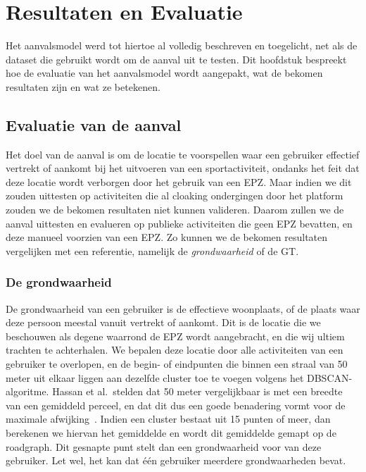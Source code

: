 \chapter{Resultaten en Evaluatie}
Het aanvalsmodel werd tot hiertoe al volledig beschreven en toegelicht, net als
de dataset die gebruikt wordt om de aanval uit te testen. Dit hoofdstuk
bespreekt hoe de evaluatie van het aanvalsmodel wordt aangepakt, wat de bekomen
resultaten zijn en wat ze betekenen.

\section{Evaluatie van de aanval}
Het doel van de aanval is om de locatie te voorspellen waar een gebruiker
effectief vertrekt of aankomt bij het uitvoeren van een sportactiviteit,
ondanks het feit dat deze locatie wordt verborgen door het gebruik van een
\ac{EPZ}. Maar indien we dit zouden uittesten op activiteiten die al cloaking
ondergingen door het platform zouden we de bekomen resultaten niet kunnen
valideren. Daarom zullen we de aanval uittesten en evalueren op publieke
activiteiten die geen \ac{EPZ} bevatten, en deze manueel voorzien van een
\ac{EPZ}. Zo kunnen we de bekomen resultaten vergelijken met een referentie,
namelijk de \textit{grondwaarheid} of de \ac{GT}.

\subsection{De grondwaarheid}\label{sec:groundtruth}
De grondwaarheid van een gebruiker is de effectieve woonplaats, of de plaats
waar deze persoon meestal vanuit vertrekt of aankomt. Dit is de locatie die we
beschouwen als degene waarrond de \ac{EPZ} wordt aangebracht, en die wij ultiem
trachten te achterhalen. We bepalen deze locatie door alle activiteiten van een
gebruiker te overlopen, en de begin- of eindpunten die binnen een straal van 50
meter uit elkaar liggen aan dezelfde cluster toe te voegen volgens het
\ac{DBSCAN}-algoritme. Hassan et al.\ stelden dat 50 meter vergelijkbaar is met
een breedte van een gemiddeld perceel, en dat dit dus een goede benadering
vormt voor de maximale afwijking~\cite{sec18has3:online, Verdonck_2022}. Indien
een cluster bestaat uit 15 punten of meer, dan berekenen we hiervan het
gemiddelde en wordt dit gemiddelde gemapt op de roadgraph. Dit gesnapte punt
stelt dan een grondwaarheid voor van deze gebruiker. Let wel, het kan dat één
gebruiker meerdere grondwaarheden bevat.

